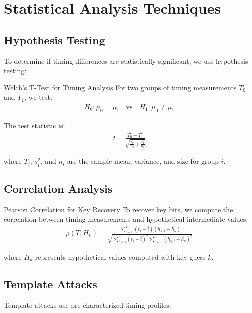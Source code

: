 \documentclass[12pt,a4paper]{article}
\theoremstyle{definition}
\begin{document}
\section{Statistical Analysis Techniques}

\subsection{Hypothesis Testing}

To determine if timing differences are statistically significant, we use hypothesis testing:

\begin{definitionbox}{Welch's T-Test for Timing Analysis}
For two groups of timing measurements $T_0$ and $T_1$, we test:
\begin{align}
H_0: \mu_0 = \mu_1 \quad \text{vs} \quad H_1: \mu_0 \neq \mu_1
\end{align}

The test statistic is:
\begin{align}
t = \frac{\bar{T_0} - \bar{T_1}}{\sqrt{\frac{s_0^2}{n_0} + \frac{s_1^2}{n_1}}}
\end{align}

where $\bar{T_i}$, $s_i^2$, and $n_i$ are the sample mean, variance, and size for group $i$.
\end{definitionbox}

\subsection{Correlation Analysis}

\begin{definitionbox}{Pearson Correlation for Key Recovery}
To recover key bits, we compute the correlation between timing measurements and hypothetical intermediate values:
\begin{align}
\rho(T, H_k) = \frac{\sum_{i=1}^{n}(t_i - \bar{t})(h_{k,i} - \bar{h_k})}{\sqrt{\sum_{i=1}^{n}(t_i - \bar{t})^2 \sum_{i=1}^{n}(h_{k,i} - \bar{h_k})^2}}
\end{align}

where $H_k$ represents hypothetical values computed with key guess $k$.
\end{definitionbox}

\subsection{Template Attacks}

Template attacks use pre-characterized timing profiles:
\end{document}
